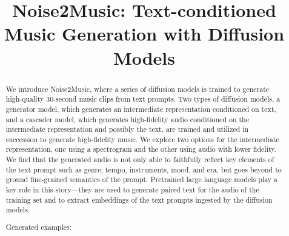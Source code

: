 \title{Noise2Music: Text-conditioned Music Generation with Diffusion Models}




\printAffiliationsAndNotice{\icmlEqualContribution\icmlCoreContributors} %

\begin{abstract}
We introduce Noise2Music, where a series of diffusion models is trained to generate high-quality 30-second music clips from text prompts. Two types of diffusion models, a generator model, which generates an intermediate representation conditioned on text, and a cascader model, which generates high-fidelity audio conditioned on the intermediate representation and possibly the text, are trained and utilized in succession to generate high-fidelity music. We explore two options for the intermediate representation, one using a spectrogram and the other using audio with lower fidelity. We find that the generated audio is not only able to faithfully reflect key elements of the text prompt such as genre, tempo, instruments, mood, and era, but goes beyond to ground fine-grained semantics of the prompt. Pretrained large language models play a key role in this story---they are used to generate paired text for the audio of the training set and to extract embeddings of the text prompts ingested by the diffusion models.

Generated examples: 

\href{\website}{\website}

\end{abstract}


